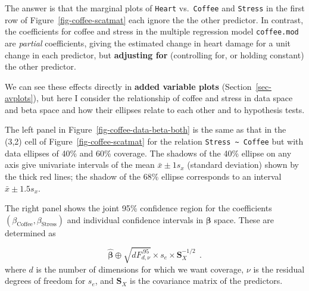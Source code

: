 \documentclass[
  letterpaper,
  10pt,
  krantz2]{krantz}
\begin{document}
The answer is that the marginal plots of \texttt{Heart}
vs.~\texttt{Coffee} and \texttt{Stress} in the first row of
Figure~\ref{fig-coffee-scatmat} each ignore the the other predictor. In
contrast, the coefficients for coffee and stress in the multiple
regression model \texttt{coffee.mod} are \emph{partial} coefficients,
giving the estimated change in heart damage for a unit change in each
predictor, but \textbf{adjusting for} (controlling for, or holding
constant) the other predictor.

We can see these effects directly in \textbf{added variable plots}
(Section~\ref{sec-avplots}), but here I consider the relationship of
coffee and stress in data space and beta space and how their ellipses
relate to each other and to hypothesis tests.

The left panel in Figure~\ref{fig-coffee-data-beta-both} is the same as
that in the (3,2) cell of Figure~\ref{fig-coffee-scatmat} for the
relation \texttt{Stress\ \textasciitilde{}\ Coffee} but with data
ellipses of 40\% and 60\% coverage. The shadows of the 40\% ellipse on
any axis give univariate intervals of the mean \(\bar{x} \pm 1 s_x\)
(standard deviation) shown by the thick red lines; the shadow of the
68\% ellipse corresponds to an interval \(\bar{x} \pm 1.5 s_x\).

The right panel shows the joint 95\% confidence region for the
coefficients \((\beta_{\text{Coffee}}, \beta_{\text{Stress}})\) and
individual confidence intervals in \(\mathbf{\beta}\) space. These are
determined as

\[
 \widehat{\mathbf{\beta}} \oplus \sqrt{d F^{.95}_{d, \nu}} \times s_e \times \mathbf{S}_X^{-1/2} \:\: .
\] where \(d\) is the number of dimensions for which we want coverage,
\(\nu\) is the residual degrees of freedom for \(s_e\), and
\(\mathbf{S}_X\) is the covariance matrix of the predictors.
\end{document}
